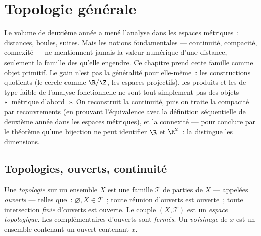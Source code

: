 \chapter{Topologie générale}\label{ch:b3:topology}

Le volume de deuxième année a mené l'analyse dans les espaces
métriques~: distances, boules, suites. Mais les notions
fondamentales --- continuité, compacité, connexité --- ne
mentionnent jamais la valeur numérique d'une distance, seulement
la famille des \emph{} qu'elle engendre. Ce chapitre prend
cette famille comme objet primitif. Le gain n'est pas la
généralité pour elle-même~: les constructions quotients (le
cercle comme $\R/\Z$, les espaces projectifs), les produits et
les  de type faible de l'analyse fonctionnelle ne
sont tout simplement pas des objets «~métrique d'abord~». On
reconstruit la continuité, puis on traite la compacité par
recouvrements  (en prouvant l'équivalence avec la
définition séquentielle de deuxième année dans les espaces
métriques), et la connexité --- pour conclure par le théorème
qu'une bijection  ne peut identifier $\R$ et $\R^2$~: la
 distingue les dimensions.

\section{Topologies, ouverts, continuité}

\begin{definition}\label{def:b3:topology:topology}
Une \emph{topologie} sur un ensemble $X$ est
une famille $\mathcal T$ de parties de $X$ --- appelées
\emph{ouverts} --- telles que~:
$\varnothing, X \in \mathcal T$~; toute réunion d'ouverts est
ouverte~; toute intersection \emph{finie} d'ouverts est ouverte.
Le couple $(X, \mathcal T)$ est un \emph{espace topologique}.
Les complémentaires d'ouverts sont \emph{fermés}. Un
\emph{voisinage} de $x$ est un ensemble
contenant un ouvert contenant $x$.
\end{definition}

